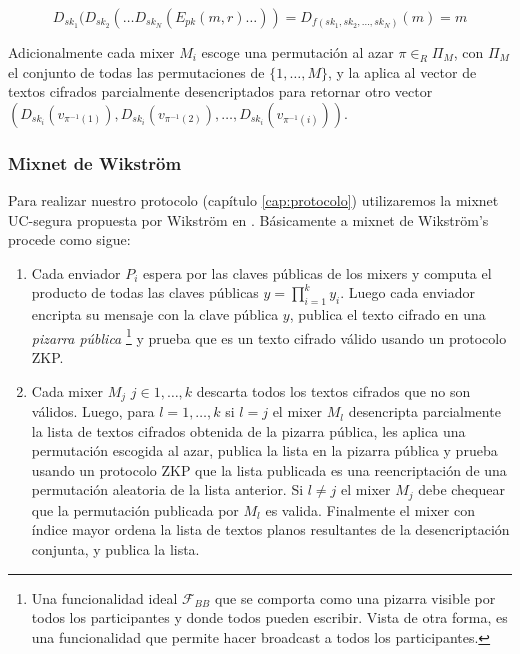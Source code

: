 \[
D_{sk_{1}}(D_{sk_{2}}(\ldots D_{sk_{N}}(E_{pk}(m,r)\ldots))=D_{f(sk_{1},sk_{2},\ldots,sk_{N})}(m)=m\]

Adicionalmente cada mixer $M_{i}$ escoge una permutación al azar
$\pi\in_{R}\Pi_{M}$, con $\Pi_{M}$ el conjunto
de todas las permutaciones de $\{1,\ldots,M\}$, y la aplica al vector
de textos cifrados parcialmente desencriptados para retornar otro
vector $(D_{sk_{i}}(v_{\pi^{-1}(1)}),D_{sk_{i}}(v_{\pi^{-1}(2)}),\ldots,D_{sk_{i}}(v_{\pi^{-1}(i)}))$.

\subsubsection{Mixnet de Wikstr\"om}

Para realizar nuestro protocolo (capítulo \ref{cap:protocolo}) utilizaremos la mixnet
UC-segura propuesta por Wikstr\"om en \cite{Wikstrom04a}. Básicamente a mixnet de Wikstr\"om's
procede como sigue:

\begin{enumerate}

\item Cada enviador $P_i$ espera por las claves públicas de los mixers y computa el producto
      de todas las claves públicas $y = \prod_{i=1}^k y_i$. Luego cada enviador encripta su mensaje
      con la clave pública $y$, publica el texto cifrado en una \textit{pizarra pública}
      \footnote{Una funcionalidad ideal $\mathcal{F}_{BB}$ que se comporta como una pizarra visible por todos
      los participantes y donde todos pueden escribir. Vista de otra forma, es una funcionalidad que permite
      hacer broadcast a todos los participantes.}
      y prueba que es un texto cifrado válido usando un protocolo ZKP.
\item Cada mixer $M_j$ $j\in{1, \ldots, k}$ descarta todos los textos cifrados que no son válidos.
      Luego, para $l = 1, \ldots, k$ si $l = j$ el mixer $M_l$ desencripta parcialmente la lista
      de textos cifrados obtenida de la pizarra pública, les aplica una permutación escogida al azar,
      publica la lista en la pizarra pública y prueba usando un protocolo ZKP que la lista publicada
      es una reencriptación de una permutación aleatoria de la lista anterior.
      Si $l \neq j$ el mixer $M_j$ debe chequear que la permutación publicada por $M_l$ es valida.
      Finalmente el mixer con índice mayor ordena la lista de textos planos resultantes de la
      desencriptación conjunta, y publica la lista.

\end{enumerate}

